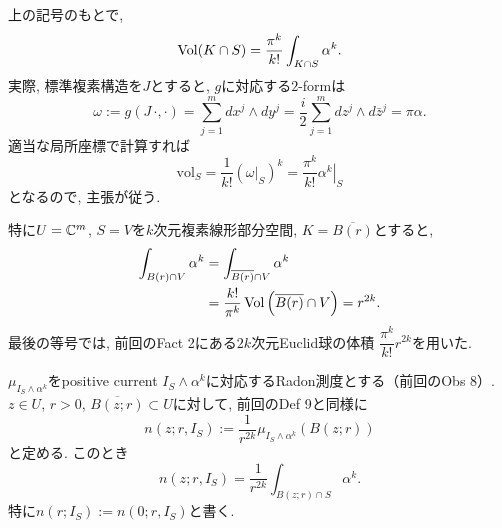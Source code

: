 \begin{rem}
\label{rem-H-0925-volume}
上の記号のもとで,
\begin{equation*}
\operatorname{Vol}(K\cap S)=\frac{\pi^k}{k!}\int_{K\cap S}\alpha^k.
\end{equation*}
実際, 標準複素構造を$J$とすると,
$g$に対応する$2$-formは
\begin{equation*}
\omega:=g(J\,\cdot,\cdot)
=\sum_{j=1}^m dx^j\wedge dy^j
=\frac{i}{2}\sum_{j=1}^m dz^j\wedge d\bar z^j
=\pi\alpha.
\end{equation*}
適当な局所座標で計算すれば
\begin{equation*}
\mathrm{vol}_S
=\frac{1}{k!}\left(\left.\omega\right|_S\right)^k
=\frac{\pi^k}{k!}\left.\alpha^k\right|_S
\end{equation*}
となるので, 主張が従う.

特に$U=\mathbb{C}^m$, $S=V$を$k$次元複素線形部分空間,
$K=\overline{B(r)}$とすると,
\begin{align*}
\int_{B(r)\cap V}\alpha^k
&=\int_{\overline{B(r)}\cap V}\alpha^k\\
&=\frac{k!}{\pi^k}\operatorname{Vol}\left(\overline{B(r)}\cap V\right)
=r^{2k}.
\end{align*}
最後の等号では, 前回のFact 2にある$2k$次元Euclid球の体積
$\dfrac{\pi^k}{k!}r^{2k}$を用いた.
\end{rem}

\begin{tcolorbox}[mybox]
\begin{lem}
\label{lem-H-0925-measure}
$\mu_{I_S\wedge\alpha^k}$をpositive current
$I_S\wedge\alpha^k$に対応するRadon測度とする（前回のObs 8）.
$z\in U$, $r>0$, $\overline{B(z;r)}\subset U$に対して,
前回のDef 9と同様に
\begin{equation*}
n(z;r,I_S):=\frac{1}{r^{2k}}
\mu_{I_S\wedge\alpha^k}(B(z;r))
\end{equation*}
と定める. このとき
\begin{equation*}
n(z;r,I_S)=\frac{1}{r^{2k}}\int_{B(z;r)\cap S}\alpha^k.
\end{equation*}
特に$n(r;I_S):=n(0;r,I_S)$と書く.
\end{lem}
\end{tcolorbox}


